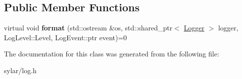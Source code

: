 \subsection*{Public Member Functions}
\begin{DoxyCompactItemize}
\item 
\hypertarget{classsylar_1_1LogFormatter_1_1FormatItem_a9b5a96deef42266710d4733993f61393}{virtual void {\bfseries format} (std\-::ostream \&os, std\-::shared\-\_\-ptr$<$ \hyperlink{classsylar_1_1Logger}{Logger} $>$ logger, Log\-Level\-::\-Level, Log\-Event\-::ptr event)=0}\label{classsylar_1_1LogFormatter_1_1FormatItem_a9b5a96deef42266710d4733993f61393}

\end{DoxyCompactItemize}


The documentation for this class was generated from the following file\-:\begin{DoxyCompactItemize}
\item 
sylar/log.\-h\end{DoxyCompactItemize}
